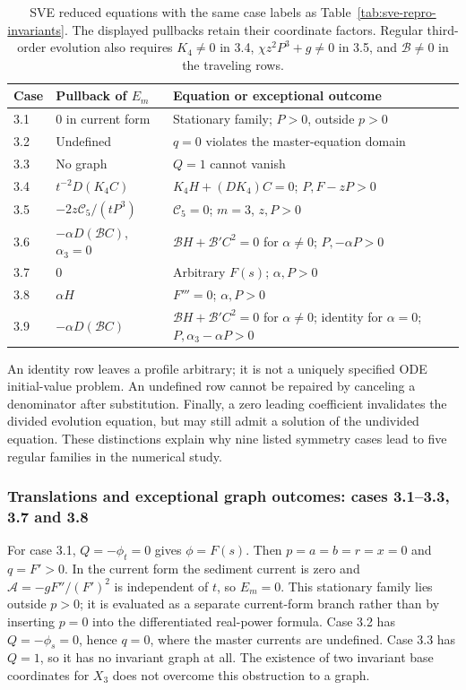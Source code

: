 \documentclass[11pt]{article}
\theoremstyle{definition}
\begin{document}
\begin{table}[htbp]
\centering\small
\begin{tabularx}{\linewidth}{@{}p{.85cm}p{4.6cm}X@{}}
\toprule
Case & Pullback of $E_m$ & Equation or exceptional outcome\\
\midrule
3.1 & $0$ in current form & Stationary family; $P>0$, outside $p>0$\\
3.2 & Undefined & $q=0$ violates the master-equation domain\\
3.3 & No graph & $Q=1$ cannot vanish\\
3.4 & $t^{-2}D(K_4C)$ & $K_4H+(DK_4)C=0$; $P,F-zP>0$\\
3.5 & $-2z\mathcal C_5/(tP^3)$ & $\mathcal C_5=0$; $m=3$, $z,P>0$\\
3.6 & $-\alpha D(\mathcal B C)$, $\alpha_3=0$ & $\mathcal B H+\mathcal B'C^2=0$ for $\alpha\ne0$; $P,-\alpha P>0$\\
3.7 & $0$ & Arbitrary $F(s)$; $\alpha,P>0$\\
3.8 & $\alpha H$ & $F'''=0$; $\alpha,P>0$\\
3.9 & $-\alpha D(\mathcal B C)$ & $\mathcal B H+\mathcal B'C^2=0$ for $\alpha\ne0$; identity for $\alpha=0$; $P,\alpha_3-\alpha P>0$\\
\bottomrule
\end{tabularx}
\caption{SVE reduced equations with the same case labels as
Table~\ref{tab:sve-repro-invariants}. The displayed pullbacks retain their
coordinate factors. Regular third-order evolution also requires
$K_4\ne0$ in 3.4, $\chi z^2P^3+g\ne0$ in 3.5, and
$\mathcal B\ne0$ in the traveling rows.}
\label{tab:sve-reduced-equations}
\end{table}

An identity row leaves a profile arbitrary; it is not a uniquely specified
ODE initial-value problem. An undefined row cannot be repaired by canceling
a denominator after substitution. Finally, a zero leading coefficient
invalidates the divided evolution equation, but may still admit a solution
of the undivided equation. These distinctions explain why nine listed
symmetry cases lead to five regular families in the numerical study.

\subsubsection{Translations and exceptional graph outcomes: cases 3.1--3.3, 3.7 and 3.8}
For case 3.1, $Q=-\phi_t=0$ gives $\phi=F(s)$. Then
$p=a=b=r=x=0$ and $q=F'>0$. In the current form the sediment
current is zero and $\mathcal A=-gF''/(F')^2$ is independent of $t$,
so $E_m=0$. This stationary family lies outside $p>0$; it is evaluated
as a separate current-form branch rather than by inserting $p=0$
into the differentiated real-power formula.
Case 3.2 has $Q=-\phi_s=0$, hence $q=0$, where the master currents
are undefined. Case 3.3 has $Q=1$, so it has no invariant graph at all.
The existence of two invariant base coordinates for $X_3$ does not
overcome this obstruction to a graph.
\end{document}

